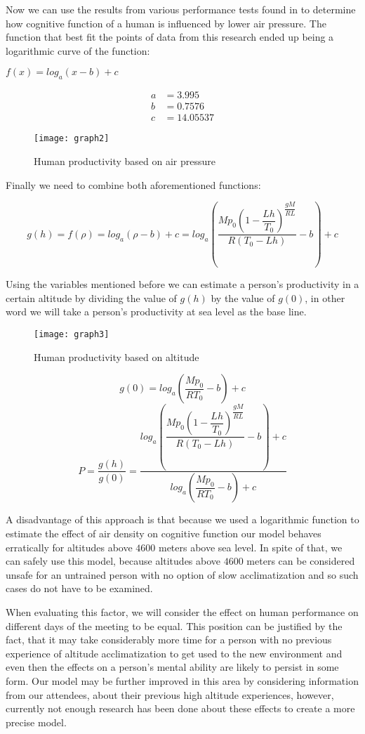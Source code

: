 Now we can use the results from various performance tests found in \cite{Research1996} to determine how cognitive function of a human is influenced by lower air pressure. The function that best fit the points of data from this research ended up being a logarithmic curve of the function:
\begin{center}
$f(x)=log_a\left(x-b\right)+c$
\end{center}
\begin{align*}
a &= 3.995\\
b &= 0.7576\\
c &= 14.05537
\end{align*}

\begin{figure}[ht]
	\centering
    	\texttt{[image: graph2]}
    \caption{Human productivity based on air pressure}
\end{figure}

Finally we need to combine both aforementioned functions:

$$g(h)=f(\rho)=log_a\left(\rho-b\right)+c=log_a\left(\dfrac{M p_0 \left(1-\dfrac{Lh}{T_0}\right)^{\dfrac{gM}{RL}}  }{ R (T_0-Lh)  }-b\right)+c$$

Using the variables mentioned before we can estimate a person's productivity in a certain altitude by dividing the value of $g(h)$ by the value of $g(0)$, in other word we will take a person's productivity at sea level as the base line. 

\begin{figure}[ht]
	\centering
    	\texttt{[image: graph3]}
    \caption{Human productivity based on altitude}
\end{figure}

$$ g(0) = log_a\left(\dfrac{M p_0 }{ R T_0  }-b\right)+c$$
$$P = \frac{g(h)}{g(0)} = \frac{ log_a\left(\dfrac{M p_0 \left(1-\dfrac{Lh}{T_0}\right)^{\dfrac{gM}{RL}}  }{ R (T_0-Lh)  }-b\right)+c }{ log_a\left(\dfrac{M p_0 }{ R T_0  }-b\right)+c }$$

A disadvantage of this approach is that because we used a logarithmic function to estimate the effect of air density on cognitive function our model behaves erratically for altitudes above $4600$ meters above sea level. In spite of that, we can safely use this model, because altitudes above $4600$ meters can be considered unsafe for an untrained person with no option of slow acclimatization and so such cases do not have to be examined.

When evaluating this factor, we will consider the effect on human performance on different days of the meeting to be equal. This position can be justified by the fact, that it may take considerably more time for a person with no previous experience of altitude acclimatization to get used to the new environment and even then the effects on a person's mental ability are likely to persist in some form. Our model may be further improved in this area by considering information from our attendees, about their previous high altitude experiences, however, currently not enough research has been done about these effects to create a more precise model.
